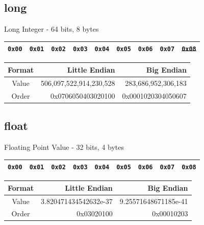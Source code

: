 \documentclass{beamer}
\begin{document}
\subsection{long}
\begin{frame}{Long Integer - 64 bits, 8 bytes}

\begin{table}[]
\begin{tabular}{|l|l|l|l|l|l|l|l|l|}
\hline
 \color{red}\texttt{0x00} & \color{red}\texttt{0x01} & \color{red}\texttt{0x02} & \color{red}\texttt{0x03} & \color{red}\texttt{0x04} & \color{red}\texttt{0x05} & \color{red}\texttt{0x06} & \color{red}\texttt{0x07} &
 \sout{\texttt{0x08}} \\
\hline 
\end{tabular}
\end{table}

\begin{table}[]
\begin{tabular}{c r r}
Format & Little Endian & Big Endian \\
\hline
Value &  506,097,522,914,230,528   & 283,686,952,306,183 \\
Order & 0x0706050403020100 & 0x0001020304050607
\end{tabular}
\end{table}

\end{frame}

\subsection{float}
\begin{frame}{Floating Point Value - 32 bits, 4 bytes}

\begin{table}[]
\begin{tabular}{|l|l|l|l|l|l|l|l|l|}
\hline
 \color{red}\texttt{0x00} & \color{red}\texttt{0x01} & \color{red}\texttt{0x02} & \color{red}\texttt{0x03} & \texttt{0x04} & \texttt{0x05} & \texttt{0x06} & \texttt{0x07} &
 \texttt{0x08} \\
\hline 
\end{tabular}
\end{table}

\begin{table}[]
\begin{tabular}{c r r}
Format & Little Endian & Big Endian \\
\hline
Value &  3.820471434542632e-37   & 9.25571648671185e-41 \\
Order & 0x03020100 & 0x00010203
\end{tabular}
\end{table}

\end{frame}
\end{document}
